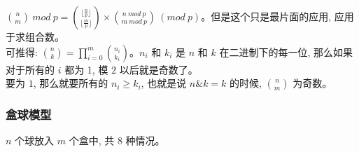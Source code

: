 \documentclass[a4paper,12pt]{article}
\begin{document}
\noindent \(
\binom{n}{m} \ mod \ p = \binom{\lfloor \frac{n}{p} \rfloor}{\lfloor \frac{m}{p} \rfloor} \times \binom{n \ mod \ p}{m \ mod \ p} \ (mod \ p)
\)。但是这个只是最片面的应用, 应用于求组合数。\\

\noindent 可推得: \(\binom{n}{k} = \prod_{i=0}^m \binom{n_i}{k_i}\)。\(n_i\) 和 \(k_i\) 是 \(n\) 和 \(k\) 在二进制下的每一位, 那么如果对于所有的 \(i\) 都为 1, 
模 \(2\) 以后就是奇数了。 \\

\noindent 要为 \(1\), 那么就要所有的 \(n_i \geq k_i\), 也就是说 \(n \& k = k\) 的时候, \(\binom{n}{m}\) 为奇数。

\subsubsection{盒球模型}

\noindent \(n\) 个球放入 \(m\) 个盒中, 共 \(8\) 种情况。
\end{document}
